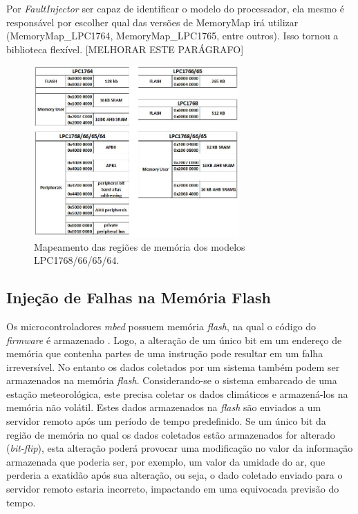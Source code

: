 Por \textit{FaultInjector} ser capaz de identificar o modelo do processador, ela mesmo é responsável por escolher qual das versões de MemoryMap irá utilizar (MemoryMap\_LPC1764, MemoryMap\_LPC1765, entre outros). Isso tornou a biblioteca flexível. [MELHORAR ESTE PARÁGRAFO]

\begin{figure}[H]
	\centering
	\includegraphics[width=0.7\textwidth]{figuras/memoryMap.jpg}
	\caption[Mapas das Regiões de Memória dos Modelos LPC1768/66/65/64]{Mapeamento das regiões de memória dos modelos LPC1768/66/65/64.}
	\label{Img:memoryMap}	
\end{figure}


\subsection{Injeção de Falhas na Memória Flash} \label{subsec:InjecaoFalhasFlash}

Os microcontroladores \textit{mbed} possuem memória \textit{flash}, na qual o código do \textit{firmware} é armazenado \cite{manualLpc176x:2016}. Logo, a alteração de um único bit em um endereço de memória que contenha partes de uma instrução pode resultar em um falha irreversível. No entanto os dados coletados por um sistema também podem ser armazenados na memória \textit{flash}. Considerando-se o sistema embarcado de uma estação meteorológica, este precisa coletar os dados climáticos e armazená-los na memória não volátil. Estes dados armazenados na \textit{flash} são enviados a um servidor remoto após um período de tempo predefinido. Se um único bit da região de memória no qual os dados coletados estão armazenados for alterado (\textit{bit-flip}), esta alteração poderá provocar uma modificação no valor da informação armazenada que poderia ser, por exemplo, um valor da umidade do ar, que perderia a exatidão após sua alteração, ou seja, o dado coletado enviado para o servidor remoto estaria incorreto, impactando em uma equivocada previsão do tempo. 

